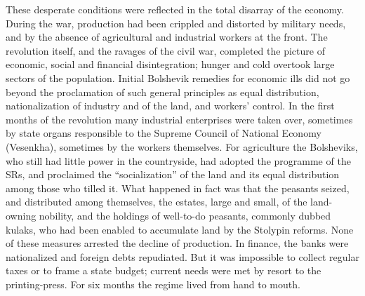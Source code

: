 These desperate conditions were reflected in the total disarray of the economy. During the war, production had been crippled and distorted by military needs, and by the absence of agricultural and industrial workers at the front. The revolution itself, and the ravages of the civil war, completed the picture of economic, social and financial disintegration; hunger and cold overtook large sectors of the population. Initial Bolshevik remedies for economic ills did not go beyond the proclamation of such general principles as equal distribution, nationalization of industry and of the land, and workers' control. In the first months of the revolution many industrial enterprises were taken over, sometimes by state organs responsible to the Supreme Council of National Economy (Vesenkha), sometimes by the workers themselves. For agriculture the Bolsheviks, who still had little power in the countryside, had adopted the programme of the SRs, and proclaimed the ``socialization'' of the land and its equal distribution among those who tilled it. What happened in fact was that the peasants seized, and distributed among themselves, the estates, large and small, of the land-owning nobility, and the holdings of well-to-do peasants, commonly dubbed kulaks, who had been enabled to accumulate land by the Stolypin reforms. None of these measures arrested the decline of production. In finance, the banks were nationalized and foreign debts repudiated. But it was impossible to collect regular taxes or to frame a state budget; current needs were met by resort to the printing-press. For six months the regime lived from hand to mouth. 

